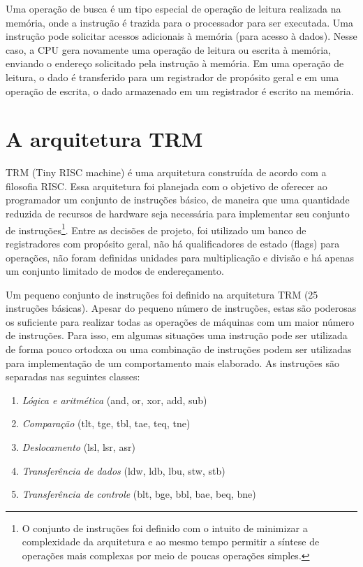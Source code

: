 \documentclass[11pt,a4paper]{report}
\begin{document}
Uma operação de busca é um tipo especial de operação de leitura realizada
na memória, onde a instrução é trazida para o processador para ser
executada. Uma instrução pode solicitar acessos adicionais à memória
(para acesso à dados). Nesse caso, a CPU gera novamente uma operação
de leitura ou escrita à memória, enviando o endereço solicitado pela
instrução à memória. Em uma operação de leitura, o dado é transferido
para um registrador de propósito geral e em uma operação de escrita,
o dado armazenado em um registrador é escrito na memória.


\chapter{A arquitetura TRM}

TRM (Tiny RISC machine) é uma arquitetura construída de acordo com a
filosofia RISC. Essa arquitetura foi planejada com o objetivo de oferecer
ao programador um conjunto de instruções básico, de maneira que uma
quantidade reduzida de recursos de hardware seja necessária para 
implementar seu conjunto de instruções\footnote{O conjunto de instruções
foi definido com o intuito de minimizar a complexidade da arquitetura e
ao mesmo tempo permitir a síntese de operações mais complexas por meio
de poucas operações simples.}. Entre as decisões de projeto, foi utilizado
um banco de registradores com propósito geral, não há qualificadores de
estado (flags) para operações, não foram definidas unidades para
multiplicação e divisão e há apenas um conjunto limitado de modos de
endereçamento.

Um pequeno conjunto de instruções foi definido na arquitetura TRM (25
instruções básicas). Apesar do pequeno número de instruções, estas são 
poderosas os suficiente para realizar todas as operações de máquinas com
um maior número de instruções. Para isso, em algumas situações uma
instrução pode ser utilizada de forma pouco ortodoxa ou uma combinação
de instruções podem ser utilizadas para implementação de um comportamento
mais elaborado. As instruções são separadas nas seguintes classes:

\begin{enumerate}
\item \textit{Lógica e aritmética} (and, or, xor, add, sub)
\item \textit{Comparação} (tlt, tge, tbl, tae, teq, tne)
\item \textit{Deslocamento} (lsl, lsr, asr)
\item \textit{Transferência de dados} (ldw, ldb, lbu, stw, stb)
\item \textit{Transferência de controle} (blt, bge, bbl, bae, beq, bne)
\end{enumerate}
\end{document}
